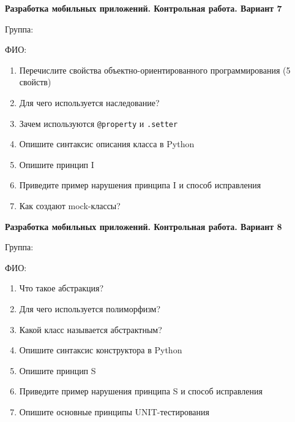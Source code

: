 \documentclass[12pt]{article}
\begin{document}
\vspace{40pt}\begin{minipage}{\textwidth}
\textbf{Разработка мобильных приложений. Контрольная работа. Вариант 7}

Группа: \underline{\hspace{3cm}}

ФИО: \underline{\hspace{10cm}}

\begin{enumerate}
\item Перечислите свойства объектно-ориентированного программирования (5 свойств)
\item Для чего используется наследование?
\item Зачем используются \verb|@property| и \verb|.setter|
\item Опишите синтаксис описания класса в Python
\item Опишите принцип I
\item Приведите пример нарушения принципа I и способ исправления
\item Как создают mock-классы?

\end{enumerate}
\end{minipage}

\vspace{40pt}\begin{minipage}{\textwidth}
\textbf{Разработка мобильных приложений. Контрольная работа. Вариант 8}

Группа: \underline{\hspace{3cm}}

ФИО: \underline{\hspace{10cm}}

\begin{enumerate}
\item Что такое абстракция?
\item Для чего используется полиморфизм?
\item Какой класс называется абстрактным?
\item Опишите синтаксис конструктора в Python
\item Опишите принцип S
\item Приведите пример нарушения принципа S и способ исправления
\item Опишите основные принципы UNIT-тестирования

\end{enumerate}
\end{minipage}
\end{document}
